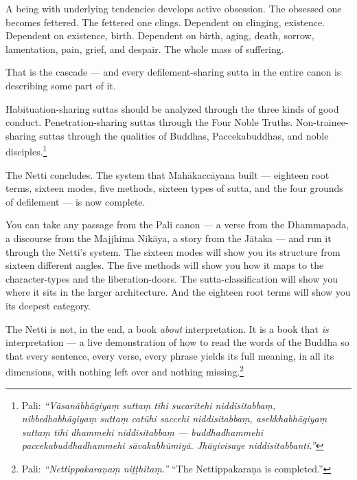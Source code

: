 A being with underlying tendencies develops active obsession. The obsessed one becomes fettered. The fettered one clings. Dependent on clinging, existence. Dependent on existence, birth. Dependent on birth, aging, death, sorrow, lamentation, pain, grief, and despair. The whole mass of suffering.

That is the cascade --- and every defilement-sharing sutta in the entire canon is describing some part of it.

Habituation-sharing suttas should be analyzed through the three kinds of good conduct. Penetration-sharing suttas through the Four Noble Truths. Non-trainee-sharing suttas through the qualities of Buddhas, Paccekabuddhas, and noble disciples.\footnote{Pali: \textit{``Vāsanābhāgiyaṃ suttaṃ tīhi sucaritehi niddisitabbaṃ, nibbedhabhāgiyaṃ suttaṃ catūhi saccehi niddisitabbaṃ, asekkhabhāgiyaṃ suttaṃ tīhi dhammehi niddisitabbaṃ --- buddhadhammehi paccekabuddhadhammehi sāvakabhūmiyā. Jhāyivisaye niddisitabbanti.''}}

\ornament

The Netti concludes. The system that Mahākaccāyana built --- eighteen root terms, sixteen modes, five methods, sixteen types of sutta, and the four grounds of defilement --- is now complete.

You can take any passage from the Pali canon --- a verse from the Dhammapada, a discourse from the Majjhima Nikāya, a story from the Jātaka --- and run it through the Netti's system. The sixteen modes will show you its structure from sixteen different angles. The five methods will show you how it maps to the character-types and the liberation-doors. The sutta-classification will show you where it sits in the larger architecture. And the eighteen root terms will show you its deepest category.

The Netti is not, in the end, a book \textit{about} interpretation. It is a book that \textit{is} interpretation --- a live demonstration of how to read the words of the Buddha so that every sentence, every verse, every phrase yields its full meaning, in all its dimensions, with nothing left over and nothing missing.\footnote{Pali: \textit{``Nettippakaraṇaṃ niṭṭhitaṃ.''} ``The Nettippakaraṇa is completed.''}

